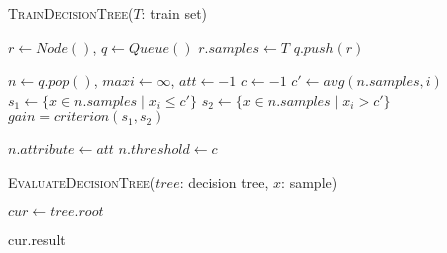 \begin{minipage}{0.92\textwidth}
    \begin{algorithm}[H]
        \caption{\textsc{TrainDecisionTree}($T$: train set)}\label{algo:train-decision-tree}
        $r \gets Node()$, $q \gets Queue()$\;
        $r.samples \gets T$\;
        $q.push(r)$\;
         {
            $n \gets q.pop()$, $maxi \gets \infty$, $att \gets -1$\;
            $c \gets -1$\;
             {
                $c' \gets avg(n.samples, i)$\;
                $s_1 \gets \{x \in n.samples \mid x_i \leq c'\}$\;
                $s_2 \gets \{x \in n.samples \mid x_i > c'\}$\;
                $gain = criterion(s_1, s_2)$\;
            }

            $n.attribute \gets att$\;
            $n.threshold \gets c$\;
            
        }
    \end{algorithm}
\end{minipage}

\begin{minipage}{0.92\textwidth}
    \begin{algorithm}[H]
        \caption{\textsc{EvaluateDecisionTree}($tree$: decision tree, $x$: sample)}\label{algo:test-decision-tree}
        $cur \gets tree.root$\;
         {
             
        }

        \KwReturn cur.result\;
    \end{algorithm}
\end{minipage}


